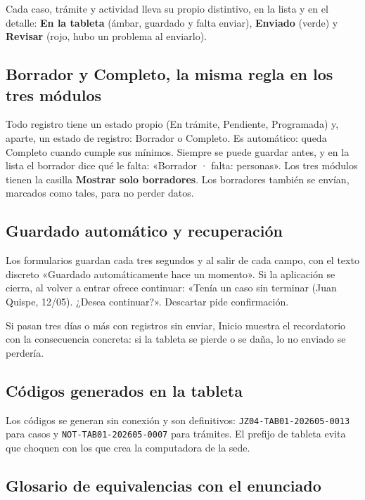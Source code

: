 \documentclass[11pt,a4paper]{article}
\begin{document}
Cada caso, trámite y actividad lleva su propio distintivo, en la lista y en el detalle: \textbf{En la tableta} (ámbar, guardado y falta enviar), \textbf{Enviado} (verde) y \textbf{Revisar} (rojo, hubo un problema al enviarlo).

\subsection{Borrador y Completo, la misma regla en los tres módulos}

Todo registro tiene un estado propio (En trámite, Pendiente, Programada) y, aparte, un estado de registro: Borrador o Completo. Es automático: queda Completo cuando cumple sus mínimos. Siempre se puede guardar antes, y en la lista el borrador dice qué le falta: «Borrador · falta: personas». Los tres módulos tienen la casilla \textbf{Mostrar solo borradores}. Los borradores también se envían, marcados como tales, para no perder datos.

\subsection{Guardado automático y recuperación}

Los formularios guardan cada tres segundos y al salir de cada campo, con el texto discreto «Guardado automáticamente hace un momento». Si la aplicación se cierra, al volver a entrar ofrece continuar: «Tenía un caso sin terminar (Juan Quispe, 12/05). ¿Desea continuar?». Descartar pide confirmación.

Si pasan tres días o más con registros sin enviar, Inicio muestra el recordatorio con la consecuencia concreta: si la tableta se pierde o se daña, lo no enviado se perdería.

\subsection{Códigos generados en la tableta}

Los códigos se generan sin conexión y son definitivos: \texttt{JZ04-TAB01-202605-0013} para casos y \texttt{NOT-TAB01-202605-0007} para trámites. El prefijo de tableta evita que choquen con los que crea la computadora de la sede.

\subsection{Glosario de equivalencias con el enunciado}
\end{document}
